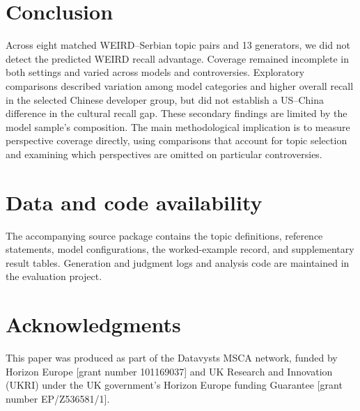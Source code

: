\documentclass[11pt,a4paper]{article}
\begin{document}
\section{Conclusion}
\label{sec:Conclusion}
Across eight matched WEIRD--Serbian topic pairs and 13 generators, we did not detect the predicted WEIRD recall advantage. Coverage remained incomplete in both settings and varied across models and controversies. Exploratory comparisons described variation among model categories and higher overall recall in the selected Chinese developer group, but did not establish a US--China difference in the cultural recall gap. These secondary findings are limited by the model sample's composition. The main methodological implication is to measure perspective coverage directly, using comparisons that account for topic selection and examining which perspectives are omitted on particular controversies.


\section{Data and code availability}
The accompanying source package contains the topic definitions, reference statements, model configurations, the worked-example record, and supplementary result tables. Generation and judgment logs and analysis code are maintained in the evaluation project.

\section{Acknowledgments}
This paper was produced as part of the Datavysts MSCA network, funded by Horizon Europe [grant number 101169037] and UK Research and Innovation (UKRI) under the UK government's Horizon Europe funding Guarantee [grant number EP/Z536581/1].
\end{document}
